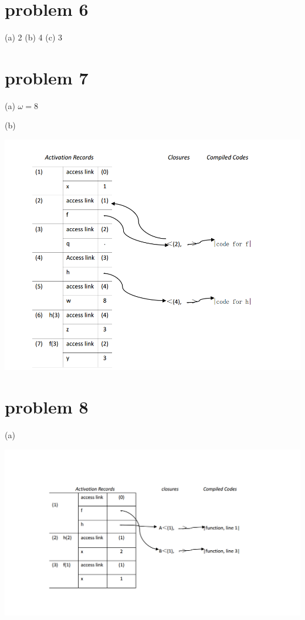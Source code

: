 \documentclass[4paper,10pt]{paper}
\begin{document}
\section*{problem 6}
(a) 2 (b) 4 (c) 3

\section*{problem 7}

(a) $\omega=8$

(b)
\begin{center}
\includegraphics[scale=0.48]{7.png}
\end{center}

\pagebreak
\section*{problem 8}
(a)
\begin{center}
\includegraphics[width=1.2\textwidth]{8(a).png}
\end{center}
\end{document}
